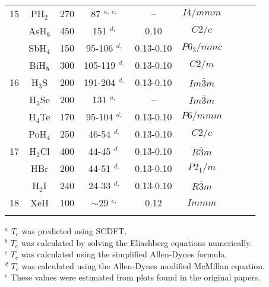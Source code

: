 \documentclass[12pt,letterpaper,oneside]{article}
\begin{document}
\begin{longtable}{ccccccccc}
\hline
15      & PH$_{2}$ & 270 & 87 $^{a,~e,}$ \cite{Flores:2016-P} & -- & $I4/mmm$ \\
      & AsH$_{8}$ & 450 & 151 $^{d,}$ \cite{Fu:2016a} & 0.10 & $C2/c$ \\
      & SbH$_{4}$ & 150 & 95-106 $^{d,}$ \cite{YanbinMa:2015b} & 0.13-0.10 & $P6_{3}/mmc$ \\     
      & BiH$_{5}$ & 300 & 105-119 $^{d,}$ \cite{YanbinMa:2015a} & 0.13-0.10 & $C2/m$ \\
\hline
16    & H$_{3}$S & 200 & 191-204 $^{d,}$ \cite{Duan:2014} & 0.13-0.10 & $Im\bar{3}m$ \\
      & H$_{3}$Se & 200 & 131 $^{a,}$ \cite{Flores:2016a} & -- & $Im\bar{3}m$ \\
      & H$_{4}$Te & 170 & 95-104 $^{d,}$ \cite{Zhong:2016} & 0.13-0.10 & $P6/mmm$ \\
      & PoH$_{4}$ & 250 & 46-54 $^{d,}$ \cite{Liu:2015d} & 0.13-0.10 & $C2/c$ \\
\hline
17    & H$_{2}$Cl & 400 & 44-45 $^{d,}$ \cite{Zeng:2017-Cl} & 0.13-0.10 & $R\bar{3}m$ \\
      & HBr & 200 & 44-51 $^{d,}$ \cite{Duan:2010} & 0.13-0.10 & $P2_{1}/m$ \\
      & H$_2$I & 240 & 24-33 $^{d,}$ \cite{Duan:2015-I} & 0.13-0.10 & $R\bar{3}m$ \\
\hline
18    & XeH & 100 & $\sim$29 $^{e,}$  \cite{Yan:2015a} & 0.12 & $Immm$ \\
\hline
\hline
\label{tab:Tc}
\end{longtable}
\noindent $^a$ $T_c$ was predicted using SCDFT. \\
$^b$ $T_c$ was calculated by solving the Eliashberg equations numerically. \\
$^c$ $T_c$ was calculated using the simplified Allen-Dynes formula. \\
$^d$ $T_c$ was calculated using the Allen-Dynes modified McMillan equation. \\ 
$^e$ These values were estimated from plots found in the original papers.


%
%
\pagebreak
\end{document}
